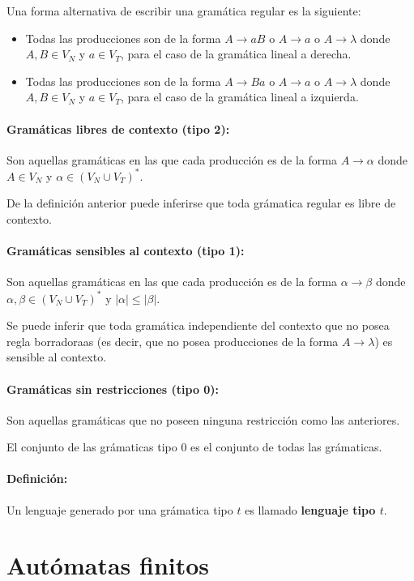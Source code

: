 Una forma alternativa de escribir una gramática regular es la siguiente:
\begin{itemize}
  \item Todas las producciones son de la forma \(A\to aB\) o \(A\to a\) o \(A\to\lambda\) donde \(A,B\in V_N\) y \(a\in V_T\), para el caso de la gramática lineal a derecha.
  \item Todas las producciones son de la forma \(A\to Ba\) o \(A\to a\) o \(A\to\lambda\) donde \(A,B\in V_N\) y \(a\in V_T\), para el caso de la gramática lineal a izquierda.
\end{itemize}

\paragraph{Gramáticas libres de contexto (tipo 2):} Son aquellas gramáticas en las que cada producción es de la forma \(A\to\alpha\) donde \(A\in V_N\) y \(\alpha\in(V_N\cup V_T)^*\).

De la definición anterior puede inferirse que toda grámatica regular es libre de contexto.

\paragraph{Gramáticas sensibles al contexto (tipo 1):} Son aquellas gramáticas en las que cada producción es de la forma \(\alpha\to\beta\) donde \(\alpha,\beta\in(V_N\cup V_T)^*\) y \(|\alpha|\leq |\beta|\).

Se puede inferir que toda gramática independiente del contexto que no posea regla borradoraas (es decir, que no posea producciones de la forma \(A\to\lambda\)) es sensible al contexto.

\paragraph{Gramáticas sin restricciones (tipo 0):} Son aquellas gramáticas que no poseen ninguna restricción como las anteriores.

El conjunto de las grámaticas tipo 0 es el conjunto de todas las grámaticas.

\paragraph{Definición:} Un lenguaje generado por una grámatica tipo \(t\) es llamado \textbf{lenguaje tipo \(t\)}.

\newpage
\section{Autómatas finitos}
